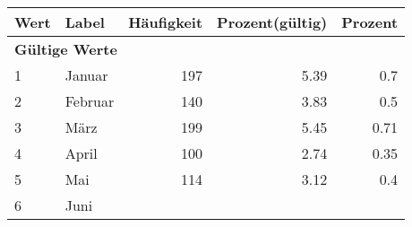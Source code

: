      \begin{longtable}{lXrrr}
     \toprule
     \textbf{Wert} & \textbf{Label} & \textbf{Häufigkeit} & \textbf{Prozent(gültig)} & \textbf{Prozent} \\
     \endhead
     \midrule
     \multicolumn{5}{l}{\textbf{Gültige Werte}}\\

     1 &
     \multicolumn{1}{X}{ Januar   } &


       \num{197} &
       \num[round-mode=places,round-precision=2]{5,39} &
         \num[round-mode=places,round-precision=2]{0,7} \\

     2 &
     \multicolumn{1}{X}{ Februar   } &


       \num{140} &
       \num[round-mode=places,round-precision=2]{3,83} &
         \num[round-mode=places,round-precision=2]{0,5} \\

     3 &
     \multicolumn{1}{X}{ März   } &


       \num{199} &
       \num[round-mode=places,round-precision=2]{5,45} &
         \num[round-mode=places,round-precision=2]{0,71} \\

     4 &
     \multicolumn{1}{X}{ April   } &


       \num{100} &
       \num[round-mode=places,round-precision=2]{2,74} &
         \num[round-mode=places,round-precision=2]{0,35} \\

     5 &
     \multicolumn{1}{X}{ Mai   } &


       \num{114} &
       \num[round-mode=places,round-precision=2]{3,12} &
         \num[round-mode=places,round-precision=2]{0,4} \\

     6 &
     \multicolumn{1}{X}{ Juni   } &



\end{longtable}
